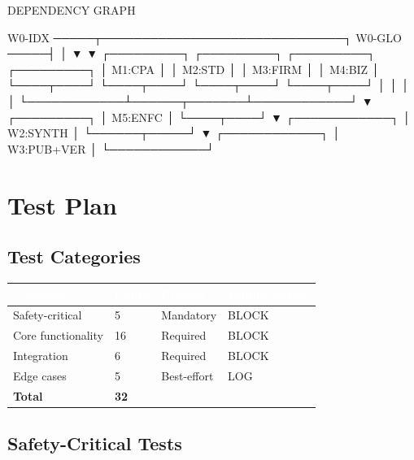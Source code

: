 \documentclass[11pt,letterpaper]{article}
\newcommand{\tableheader}[1]{\textbf{\sffamily\textcolor{white}{#1}}}
\begin{document}
\begin{asciibox}
  DEPENDENCY GRAPH

  W0-IDX ─────┬──────────────────────────────┐
  W0-GLO ─────┤                              │
              ▼                              ▼
        ┌─────────┐  ┌─────────┐    ┌─────────┐  ┌─────────┐
        │ M1:CPA  │  │ M2:STD  │    │ M3:FIRM │  │ M4:BIZ  │
        └────┬────┘  └────┬────┘    └────┬────┘  └────┬────┘
             │            │              │            │
             └────────────┴──────┬───────┴────────────┘
                                 ▼
                          ┌─────────┐
                          │ M5:ENFC │
                          └────┬────┘
                               ▼
                        ┌────────────┐
                        │ W2:SYNTH   │
                        └──────┬─────┘
                               ▼
                        ┌────────────┐
                        │ W3:PUB+VER │
                        └────────────┘
\end{asciibox}

\section{Test Plan}

\subsection{Test Categories}

\begin{center}
\begin{tabularx}{\textwidth}{L{3cm}C{1.5cm}C{2cm}C{2cm}}
\toprule
{}
\tableheader{Category} & \tableheader{Count} & \tableheader{Priority} & \tableheader{Failure Action} \\
\midrule
Safety-critical & 5 & Mandatory & BLOCK \\
Core functionality & 16 & Required & BLOCK \\
Integration & 6 & Required & BLOCK \\
Edge cases & 5 & Best-effort & LOG \\
\midrule
\textbf{Total} & \textbf{32} & & \\
\bottomrule
\end{tabularx}
\end{center}

\subsection{Safety-Critical Tests}
\end{document}
